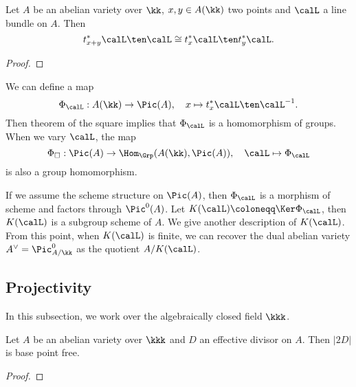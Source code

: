     \begin{theorem}\label{thm: theorem of the square}
        Let \(A\) be an abelian variety over \(\kk\), \(x,y \in A(\kk)\) two points and \(\calL\) a line bundle on \(A\).
        Then 
        \[ t_{x+y}^*\calL \ten \calL \cong t_x^*\calL \ten t_y^*\calL. \]
    \end{theorem}
    \begin{proof}
    \end{proof}

    \begin{remark}\label{rmk: theorem of the square and homomorphism to Picard group}
        We can define a map
        \[ \Phi_\calL: A(\kk) \to \Pic(A), \quad x \mapsto t_x^*\calL \ten \calL^{-1}. \]
        Then theorem of the square implies that \(\Phi_\calL\) is a homomorphism of groups.
        When we vary \(\calL\), the map 
        \[ \Phi_{\square}: \Pic(A) \to \Hom_{\Grp}(A(\kk), \Pic(A)), \quad \calL \mapsto \Phi_\calL \]
        is also a group homomorphism.
    \end{remark}

    If we assume the scheme structure on \(\Pic(A)\), then \(\Phi_\calL\) is a morphism of scheme and factors through \(\Pic^0(A)\).
    Let \(K(\calL) \coloneqq \Ker \Phi_\calL\), then \(K(\calL)\) is a subgroup scheme of \(A\).
    We give another description of \(K(\calL)\).
    From this point, when \(K(\calL)\) is finite, we can recover the dual abelian variety \(A^\vee = \Pic^0_{A/\kk}\) as the quotient \(A/K(\calL)\).



\subsection{Projectivity}

    In this subsection, we work over the algebraically closed field \(\kkk\).

    \begin{proposition}\label{prop:2D_is_base_point_free}
        Let \(A\) be an abelian variety over \(\kkk\) and \(D\) an effective divisor on \(A\).
        Then \(|2D|\) is base point free.
    \end{proposition}
    \begin{proof}
    \end{proof}

